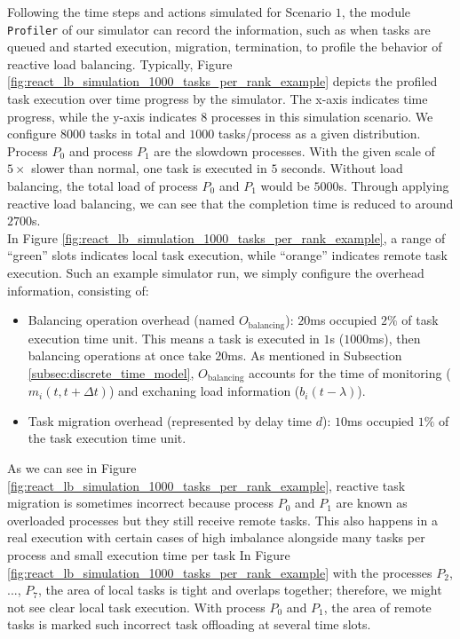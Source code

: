 Following the time steps and actions simulated for Scenario $1$, the module \texttt{Profiler} of our simulator can record the information, such as when tasks are queued and started execution, migration, termination, to profile the behavior of reactive load balancing. Typically, Figure \ref{fig:react_lb_simulation_1000_tasks_per_rank_example} depicts the profiled task execution over time progress by the simulator. The x-axis indicates time progress, while the y-axis indicates $8$ processes in this simulation scenario. We configure $8000$ tasks in total and $1000$ tasks/process as a given distribution. Process $P_{0}$ and process $P_{1}$ are the slowdown processes. With the given scale of $5 \times$ slower than normal, one task is executed in $5$ seconds. Without load balancing, the total load of process $P_{0}$ and $P_{1}$ would be $5000$s. Through applying reactive load balancing, we can see that the completion time is reduced to around $2700$s.\\

In Figure \ref{fig:react_lb_simulation_1000_tasks_per_rank_example}, a range of ``green'' slots indicates local task execution, while ``orange'' indicates remote task execution. Such an example simulator run, we simply configure the overhead information, consisting of:
\begin{itemize}
	\item Balancing operation overhead (named $O_{\text{balancing}}$): $20$ms occupied $2\%$ of task execution time unit. This means a task is executed in $1$s ($1000$ms), then balancing operations at once take $20$ms. As mentioned in Subsection \ref{subsec:discrete_time_model}, $O_{\text{balancing}}$ accounts for the time of monitoring ($m_{i}(t, t+\Delta t)$) and exchaning load information ($b_{i}(t - \lambda)$).
	\item Task migration overhead (represented by delay time $d$): $10$ms occupied $1\%$ of the task execution time unit.
\end{itemize}

As we can see in Figure \ref{fig:react_lb_simulation_1000_tasks_per_rank_example}, reactive task migration is sometimes incorrect because process $P_{0}$ and $P_{1}$ are known as overloaded processes but they still receive remote tasks. This also happens in a real execution with certain cases of high imbalance alongside many tasks per process and small execution time per task In Figure \ref{fig:react_lb_simulation_1000_tasks_per_rank_example} with the processes $P_{2}$, $...$, $P_{7}$, the area of local tasks is tight and overlaps together; therefore, we might not see clear local task execution. With process $P_{0}$ and $P_{1}$, the area of remote tasks is marked such incorrect task offloading at several time slots.\\

